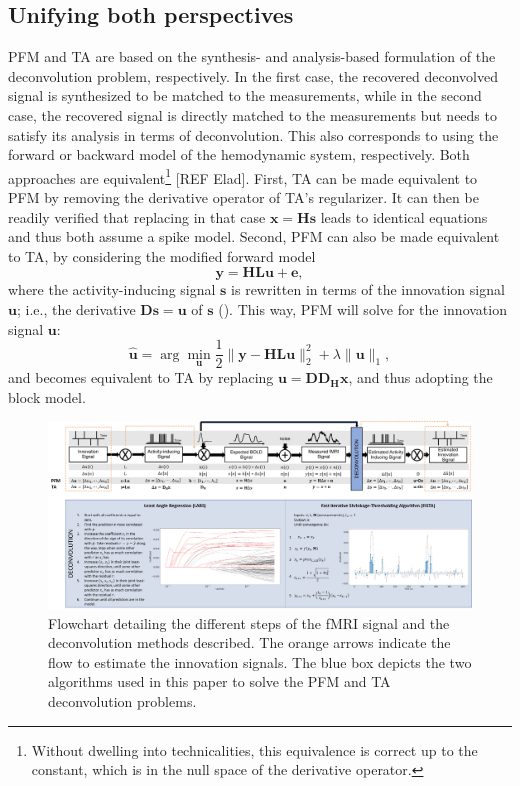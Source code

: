 \subsection{Unifying both perspectives}

PFM and TA are based on the synthesis- and analysis-based formulation of the deconvolution problem, respectively. In the first case, the recovered deconvolved signal is synthesized to be matched to the measurements, while in the second case, the recovered signal is directly matched to the measurements but needs to satisfy its analysis in terms of deconvolution. This also corresponds to using the forward or backward model of the hemodynamic system, respectively. Both approaches are equivalent\footnote{Without dwelling into technicalities, this equivalence is correct up to the constant, which is in the null space of the derivative operator.} [REF Elad]. First, TA can be made equivalent to PFM by removing the derivative operator of TA's regularizer. It can then be readily verified that replacing in that case $\mathbf{x}=\mathbf{Hs}$ leads to identical equations and thus both assume a spike model. Second, PFM can also be made equivalent to TA, by considering the modified forward model
$$
\mathbf{y} = \mathbf{H L u} + \mathbf{e},
$$
where the activity-inducing signal $\mathbf{s}$ is rewritten in terms of the innovation signal $\mathbf{u}$; i.e., the derivative $\mathbf{Ds}=\mathbf{u}$ of $\mathbf{s}$ (\citealt{cherkaoui2019SparsitybasedBlindDeconvolution,urunuela2020StabilityBasedSparseParadigm}). This way, PFM will solve for the innovation signal $\mathbf{u}$: 
\begin{equation}
    \label{eq:pfm_block}
    \hat{\mathbf{u}} = \arg \min_{\mathbf{u}} \frac{1}{2} \| \mathbf{y} - \mathbf{HLu} \|_2^2 + \lambda \| \mathbf{u} \|_1,
\end{equation}
and becomes equivalent to TA by replacing $\mathbf{u}=\mathbf{D D_H x}$, and thus adopting the block model.

\begin{figure}[H]
    \begin{center}
        \includegraphics[width=\columnwidth]{figures/flowchart.pdf}
    \end{center}
    \caption{Flowchart detailing the different steps of the fMRI signal and the deconvolution methods described. The orange arrows indicate the flow to estimate the innovation signals. The blue box depicts the two algorithms used in this paper to solve the PFM and TA deconvolution problems.}
\label{fig:flowchart}
\end{figure}

